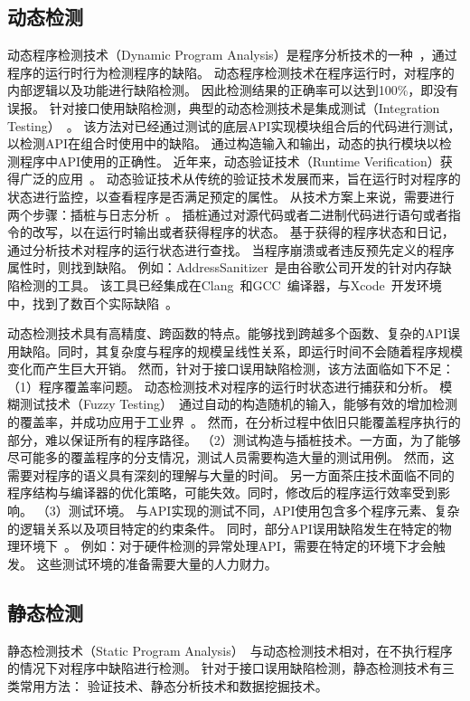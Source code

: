 \subsection{动态检测}
动态程序检测技术（Dynamic Program Analysis）是程序分析技术的一种~\cite{15-pa}，通过程序的运行时行为检测程序的缺陷。
动态程序检测技术在程序运行时，对程序的内部逻辑以及功能进行缺陷检测。
因此检测结果的正确率可以达到100\%，即没有误报。
针对接口使用缺陷检测，典型的动态检测技术是集成测试（Integration Testing）~\cite{02-icis-integration-testing}。
该方法对已经通过测试的底层API实现模块组合后的代码进行测试，以检测API在组合时使用中的缺陷。
通过构造输入和输出，动态的执行模块以检测程序中API使用的正确性。
近年来，动态验证技术（Runtime Verification）获得广泛的应用~\cite{18-rv}。
动态验证技术从传统的验证技术发展而来，旨在运行时对程序的状态进行监控，以查看程序是否满足预定的属性。
从技术方案上来说，需要进行两个步骤：插桩与日志分析~\cite{07-acm-valgrind, 91-purify, 12-atc-AddressSanitizer}。
插桩通过对源代码或者二进制代码进行语句或者指令的改写，以在运行时输出或者获得程序的状态。
基于获得的程序状态和日记，通过分析技术对程序的运行状态进行查找。
当程序崩溃或者违反预先定义的程序属性时，则找到缺陷。
例如：AddressSanitizer~\cite{12-atc-AddressSanitizer}是由谷歌公司开发的针对内存缺陷检测的工具。
该工具已经集成在Clang~\cite{clang}和GCC~\cite{gcc}编译器，与Xcode~\cite{Xcode}开发环境中，找到了数百个实际缺陷~\cite{AddressSanitizerFoundBugs}。


动态检测技术具有高精度、跨函数的特点。能够找到跨越多个函数、复杂的API误用缺陷。同时，其复杂度与程序的规模呈线性关系，即运行时间不会随着程序规模变化而产生巨大开销。
然而，针对于接口误用缺陷检测，该方法面临如下不足：
（1）程序覆盖率问题。
动态检测技术对程序的运行时状态进行捕获和分析。
模糊测试技术（Fuzzy Testing）~\cite{18-fuzz}通过自动的构造随机的输入，能够有效的增加检测的覆盖率，并成功应用于工业界~\cite{18-saner-fuzz}。
然而，在分析过程中依旧只能覆盖程序执行的部分，难以保证所有的程序路径。
（2）测试构造与插桩技术。一方面，为了能够尽可能多的覆盖程序的分支情况，测试人员需要构造大量的测试用例。
然而，这需要对程序的语义具有深刻的理解与大量的时间。
另一方面茶庄技术面临不同的程序结构与编译器的优化策略，可能失效。同时，修改后的程序运行效率受到影响。
（3）测试环境。
与API实现的测试不同，API使用包含多个程序元素、复杂的逻辑关系以及项目特定的约束条件。
同时，部分API误用缺陷发生在特定的物理环境下~\cite{15-kernel-sv}。
例如：对于硬件检测的异常处理API，需要在特定的环境下才会触发。
这些测试环境的准备需要大量的人力财力。

\subsection{静态检测}
静态检测技术（Static Program Analysis）~\cite{08-ieee-static}与动态检测技术相对，在不执行程序的情况下对程序中缺陷进行检测。
针对于接口误用缺陷检测，静态检测技术有三类常用方法：
验证技术、静态分析技术和数据挖掘技术。

